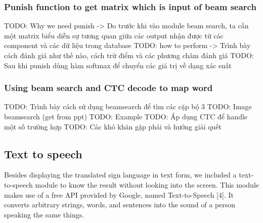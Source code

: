       \subsubsection{ Punish function to get matrix which is input of beam search }
        TODO: Why we need punish -> Do trước khi vào module beam search, ta cần một matrix biểu diễn sự tương quan giữa các output nhận được từ các component và các dữ liệu trong database
        TODO: how to perform -> Trình bày cách đánh giá như thế nào, cách trừ điểm và các phương châm đánh giá
        TODO: Sau khi punish dùng hàm softmax để chuyển các giá trị về dạng xác suất
      \subsubsection{ Using beam search and CTC decode to map word }
        TODO: Trình bày cách sử dụng beamsearch để tìm các cặp bộ 3
        TODO: Image beamsearch (get from ppt)
        TODO: Example
        TODO: Áp dụng CTC để handle một số trường hợp
        TODO: Các khó khăn gặp phải và hướng giải quết

\subsection{Text to speech}

Besides displaying the translated sign language in text form, we included a text-to-speech module to know the result without looking into the screen. This module makes use of a free API provided by Google, named Text-to-Speech [4]. It converts arbitrary strings, words, and sentences into the sound of a person speaking the same things.

